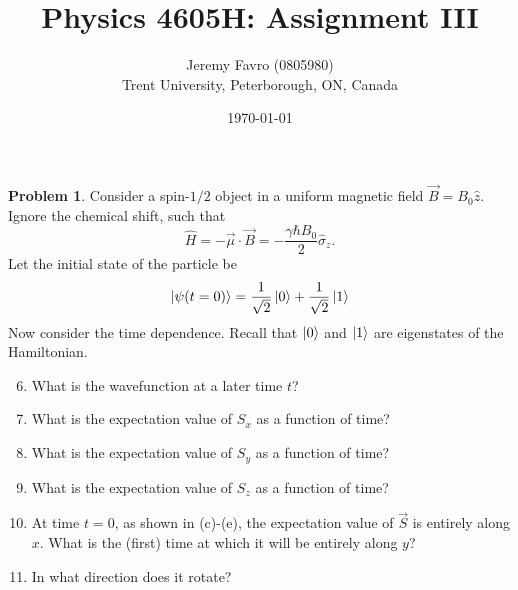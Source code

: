\documentclass[10pt]{article}
\title{Physics 4605H: Assignment III}
\author{Jeremy Favro (0805980) \\ Trent University, Peterborough, ON, Canada}
\date{\today}
\theoremstyle{definition}
\newtheorem{problem}{Problem}
\newcommand{\uz}{\hat{z}}
\newcommand{\bv}[1]{\vec{#1}}
\begin{document}
\maketitle

\setcounter{problem}{0}
\setcounter{soln}{0}
\begin{problem}
Consider a spin-$1/2$ object in a uniform magnetic field $\bv{B}=B_0\uz$. Ignore the chemical
shift, such that
$$\hat{H}=-\bv{\mu}\cdot\bv{B}=-\frac{\gamma \hbar B_0}{2}\hat{\sigma}_z.$$
Let the initial state of the particle be
$$\ket{\psi(t=0)}=\frac{1}{\sqrt{2}}\ket{0}+\frac{1}{\sqrt{2}}\ket{1}$$
Now consider the time dependence. Recall that $\ket{0}$ and $\ket{1}$ are eigenstates of the Hamiltonian.
\begin{enumerate}[label=(\alph*)]
  \setcounter{enumi}{5}
  \item What is the wavefunction at a later time $t$?
  \item What is the expectation value of $S_x$ as a function of time?
  \item What is the expectation value of $S_y$ as a function of time?
  \item What is the expectation value of $S_z$ as a function of time?
  \item At time $t = 0$, as shown in (c)-(e), the expectation value of $\bv{S}$ is entirely along $x$. What
        is the (first) time at which it will be entirely along $y$?
  \item In what direction does it rotate?
\end{enumerate}
\end{problem}
\end{document}
